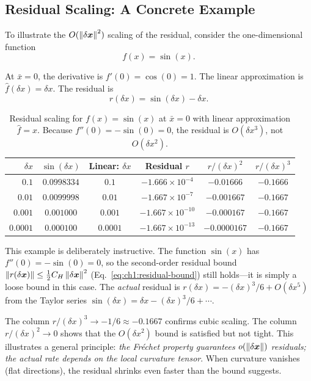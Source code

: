 \subsection{Residual Scaling: A Concrete Example}

To illustrate the $O(\left\lVert \delta\bm{x} \right\rVert^2)$ scaling of the residual, consider the one-dimensional
function
\begin{equation}
f(x) = \sin(x).
\label{eq:ch1:sin-example}
\end{equation}

At $\bar{x} = 0$, the derivative is $f'(0) = \cos(0) = 1$. The linear approximation
is $\hat{f}(\delta x) = \delta x$. The residual is
\begin{equation}
r(\delta x) = \sin(\delta x) - \delta x.
\label{eq:ch1:sin-residual}
\end{equation}

\begin{table}[h]
\centering
\caption{Residual scaling for $f(x) = \sin(x)$ at $\bar{x} = 0$ with linear approximation $\hat{f} = x$.
Because $f''(0) = -\sin(0) = 0$, the residual is $O(\delta x^3)$, not $O(\delta x^2)$.}
\label{tab:ch1:sin-residual}
\begin{tabular}{@{}rccccc@{}}
\toprule
$\delta x$ & $\sin(\delta x)$ & Linear: $\delta x$ & Residual $r$ & $r / (\delta x)^2$ & $r / (\delta x)^3$ \\
\midrule
$0.1$   & $0.0998334$ & $0.1$   & $-1.666 \times 10^{-4}$ & $-0.01666$  & $-0.1666$ \\
$0.01$  & $0.0099998$ & $0.01$  & $-1.667 \times 10^{-7}$ & $-0.001667$ & $-0.1667$ \\
$0.001$ & $0.001000$  & $0.001$ & $-1.667 \times 10^{-10}$ & $-0.000167$ & $-0.1667$ \\
$0.0001$& $0.000100$  & $0.0001$& $-1.667 \times 10^{-13}$ & $-0.0000167$& $-0.1667$ \\
\bottomrule
\end{tabular}
\end{table}

\begin{warningbox}
This example is deliberately instructive. The function $\sin(x)$ has $f''(0) = -\sin(0) = 0$,
so the second-order residual bound $\left\lVert r(\delta\bm{x}) \right\rVert \leq \tfrac{1}{2}C_H\left\lVert \delta\bm{x} \right\rVert^2$
(Eq.~\eqref{eq:ch1:residual-bound}) still holds---it is simply a loose bound in this case.
The \emph{actual} residual is $r(\delta x) = -(\delta x)^3/6 + O(\delta x^5)$ from the
Taylor series $\sin(\delta x) = \delta x - (\delta x)^3/6 + \cdots$.

The column $r/(\delta x)^3 \to -1/6 \approx -0.1667$ confirms cubic scaling. The column
$r/(\delta x)^2 \to 0$ shows that the $O(\delta x^2)$ bound is satisfied but not tight.
This illustrates a general principle: \emph{the Fréchet property guarantees
$o(\left\lVert \delta\bm{x} \right\rVert)$ residuals; the actual rate depends on the local curvature tensor}.
When curvature vanishes (flat directions), the residual shrinks even faster than the bound suggests.
\end{warningbox}

